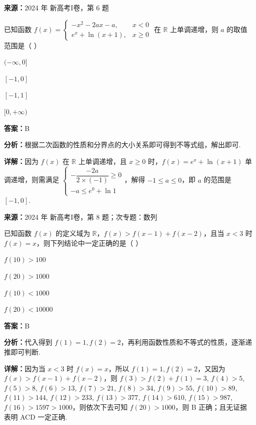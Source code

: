 \begin{question}[points=5]
\textbf{来源：}2024 年 新高考I卷，第 6 题\par
已知函数 $f(x)=\begin{cases}-x^2-2ax-a, & x<0 \\ e^x+\ln(x+1), & x\ge 0\end{cases}$ 在 $\mathbb{R}$ 上单调递增，则 $a$ 的取值范围是（ ）
\begin{choices}
  \item $(-\infty,0]$
  \item $[-1,0]$
  \item $[-1,1]$
  \item $[0,+\infty)$
\end{choices}
\begin{solution}
\textbf{答案：}B

\textbf{分析：}根据二次函数的性质和分界点的大小关系即可得到不等式组，解出即可.

\textbf{详解：}因为 $f(x)$ 在 $\mathbb{R}$ 上单调递增，且 $x\ge 0$ 时，$f(x)=e^x+\ln(x+1)$ 单调递增，则需满足 $\begin{cases} -\dfrac{-2a}{2\times(-1)}\ge 0 \\ -a\le e^0+\ln1 \end{cases}$，解得 $-1\le a\le 0$，即 $a$ 的范围是 $[-1,0]$.
\end{solution}
\end{question}

\begin{question}[points=5]
\textbf{来源：}2024 年 新高考I卷，第 8 题；次专题：数列\par
已知函数 $f(x)$ 的定义域为 $\mathbb{R}$，$f(x)>f(x-1)+f(x-2)$，且当 $x<3$ 时 $f(x)=x$，则下列结论中一定正确的是（ ）
\begin{choices}
  \item $f(10)>100$
  \item $f(20)>1000$
  \item $f(10)<1000$
  \item $f(20)<10000$
\end{choices}
\begin{solution}
\textbf{答案：}B

\textbf{分析：}代入得到 $f(1)=1,f(2)=2$，再利用函数性质和不等式的性质，逐渐递推即可判断.

\textbf{详解：}因为当 $x<3$ 时 $f(x)=x$，所以 $f(1)=1,f(2)=2$，又因为 $f(x)>f(x-1)+f(x-2)$，则 $f(3)>f(2)+f(1)=3$, $f(4)>5$, $f(5)>8$, $f(6)>13$, $f(7)>21$, $f(8)>34$, $f(9)>55$, $f(10)>89$, $f(11)>144$, $f(12)>233$, $f(13)>377$, $f(14)>610$, $f(15)>987$, $f(16)>1597>1000$，则依次下去可知 $f(20)>1000$，则 B 正确；且无证据表明 ACD 一定正确.
\end{solution}
\end{question}

